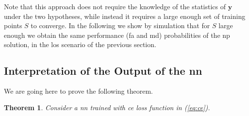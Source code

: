 \documentclass[conference,draftcls,onecolumn]{IEEEtran}
\newtheorem{theorem}{Theorem}
\begin{document}
Note that this approach does not require the knowledge of the statistics of $\bm{y}$ under the two hypotheses, while instead it requires a large enough set of training points $S$ to converge. In the following we show by simulation that for $S$ large enough we obtain the same performance (\ac{fa} and \ac{md}) probabilities of the \ac{np} solution, in the \ac{los} scenario of the previous section.

\subsection{Interpretation of the Output of the \ac{nn}}

We are going here to prove the following theorem.

\begin{theorem}
Consider a \ac{nn} trained with \ac{ce} loss function in (\ref{eq:ce}).
\end{theorem}



\end{document}
